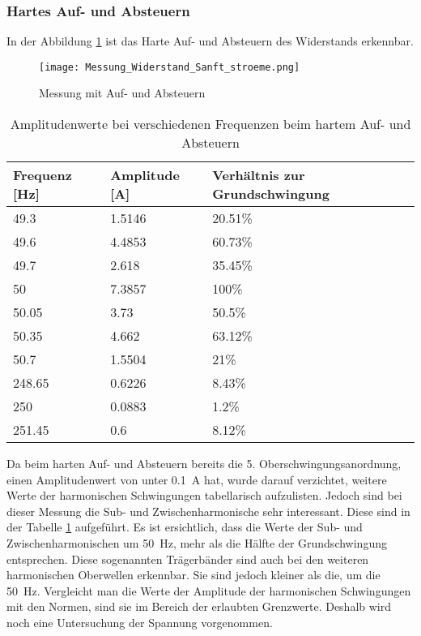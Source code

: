 \newpage
\subsubsection*{Hartes Auf- und Absteuern}

In der Abbildung \ref{fig:Mess_Widerstand_Sanft_stroeme} ist das Harte Auf- und Absteuern des Widerstands erkennbar. 

\begin{figure}[ht!]
	\centering
	\texttt{[image: Messung\_Widerstand\_Sanft\_stroeme.png]}	
	\caption{Messung mit Auf- und Absteuern}\label{fig:Mess_Widerstand_Sanft_stroeme}
\end{figure}


\begin{table}[ht!]
	\centering
	\begin{tabular}{|l|l|l|}
		\hline
		Frequenz {[}Hz{]} & Amplitude {[}A{]} & Verhältnis zur Grundschwingung	\\ \hline
		49.3              & 1.5146            & 20.51\%							\\ \hline
		49.6              & 4.4853            & 60.73\%							\\ \hline
		49.7              & 2.618             & 35.45\%							\\ \hline
		50                & 7.3857            & 100\%							\\ \hline
		50.05             & 3.73              & 50.5\%							\\ \hline
		50.35             & 4.662             & 63.12\%							\\ \hline
		50.7              & 1.5504            & 21\%							\\ \hline
		248.65            & 0.6226            & 8.43\%							\\ \hline
		250               & 0.0883            & 1.2\%							\\ \hline
		251.45            & 0.6               & 8.12\%							\\ \hline
	\end{tabular}
	\caption{Amplitudenwerte bei verschiedenen Frequenzen beim hartem Auf- und Absteuern}\label{tab:Sanft_stroeme}
\end{table}
Da beim harten Auf- und Absteuern bereits die 5. Oberschwingungsanordnung, einen Amplitudenwert von unter \SI{0.1}{A} hat, wurde darauf verzichtet, weitere Werte der harmonischen Schwingungen tabellarisch aufzulisten. Jedoch sind bei dieser Messung die Sub- und Zwischenharmonische sehr interessant. Diese sind in der Tabelle \ref{tab:Sanft_stroeme} aufgeführt. Es ist ersichtlich, dass die Werte der Sub- und Zwischenharmonischen um \SI{50}{Hz}, mehr als die Hälfte der Grundschwingung entsprechen. Diese sogenannten Trägerbänder sind auch bei den weiteren harmonischen Oberwellen erkennbar. Sie sind jedoch kleiner als die, um die \SI{50}{Hz}. Vergleicht man die Werte der Amplitude der harmonischen Schwingungen mit den Normen, sind sie im Bereich der erlaubten Grenzwerte. Deshalb wird noch eine Untersuchung der Spannung vorgenommen.



